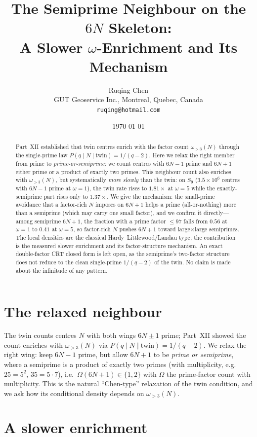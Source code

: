 \documentclass[11pt]{article}
\title{The Semiprime Neighbour on the $6N$ Skeleton:\\
A Slower $\omega$-Enrichment and Its Mechanism}
\author{Ruqing Chen\\
\small GUT Geoservice Inc., Montreal, Quebec, Canada\\
\small \texttt{ruqing@hotmail.com}}
\date{\today}
\begin{document}
\maketitle

\begin{abstract}
Part~XII established that twin centres enrich with the factor count
$\omega_{>3}(N)$ through the single-prime law $P(q\mid N\mid\text{twin})=1/(q-2)$.
Here we relax the right member from prime to \emph{prime-or-semiprime}: we count
centres with $6N-1$ prime and $6N+1$ either prime or a product of exactly two
primes. This neighbour count also enriches with $\omega_{>3}(N)$, but
systematically \emph{more slowly} than the twin: on $S_9$ ($3.5\times10^6$ centres
with $6N-1$ prime at $\omega=1$), the twin rate rises to $1.81\times$ at $\omega=5$
while the exactly-semiprime part rises only to $1.37\times$. We give the mechanism:
the small-prime avoidance that a factor-rich $N$ imposes on $6N+1$ helps a prime
(all-or-nothing) more than a semiprime (which may carry one small factor), and we
confirm it directly---among semiprime $6N+1$, the fraction with a prime factor
$\le97$ falls from $0.56$ at $\omega=1$ to $0.41$ at $\omega=5$, so factor-rich $N$
pushes $6N+1$ toward large$\times$large semiprimes. The local densities are the
classical Hardy--Littlewood/Landau type; the contribution is the measured slower
enrichment and its factor-structure mechanism. An exact double-factor CRT closed
form is left open, as the semiprime's two-factor structure does not reduce to the
clean single-prime $1/(q-2)$ of the twin. No claim is made about the infinitude of
any pattern.
\end{abstract}

\section{The relaxed neighbour}

The twin counts centres $N$ with both wings $6N\pm1$ prime; Part~XII showed the
count enriches with $\omega_{>3}(N)$ via $P(q\mid N\mid\text{twin})=1/(q-2)$. We
relax the right wing: keep $6N-1$ prime, but allow $6N+1$ to be \emph{prime or
semiprime}, where a semiprime is a product of exactly two primes (with
multiplicity, e.g.\ $25=5^2$, $35=5\cdot7$), i.e.\ $\Omega(6N+1)\in\{1,2\}$ with
$\Omega$ the prime-factor count with multiplicity. This is the natural
``Chen-type'' relaxation of the twin condition, and we ask how its conditional
density depends on $\omega_{>3}(N)$.

\section{A slower enrichment}
\end{document}
